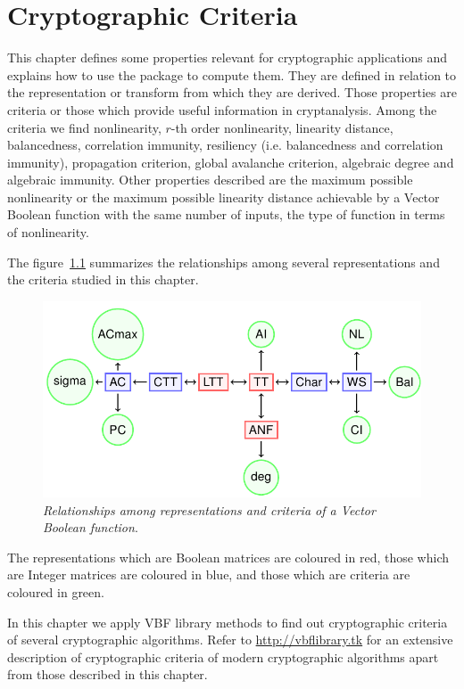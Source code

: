 
\chapter{Cryptographic Criteria}

This chapter defines some properties relevant for cryptographic applications and explains how to use the package to compute them. They are defined in relation to the representation or transform from which they are derived.
Those properties are criteria or those which provide useful information in cryptanalysis. Among the criteria we find nonlinearity, 
$r$-th order nonlinearity, linearity distance, balancedness, correlation immunity, resiliency (i.e. balancedness and correlation immunity), 
propagation criterion, global avalanche criterion, algebraic degree and algebraic immunity. Other properties described are the maximum possible nonlinearity 
or the maximum possible linearity distance achievable by a Vector Boolean function with the same number of inputs, the type of function in terms of nonlinearity.

The figure~\ref{fig:relationshipscriteria} summarizes the relationships among several representations and the criteria studied in this chapter.

\begin{figure}[htbp!]
\centering
\includegraphics[width=\textwidth]{relationships}
\caption[Relationships among representations and criteria of a Vector Boolean function]{\textit{Relationships among representations and criteria of a Vector Boolean function}.}
\label{fig:relationshipscriteria}
\end{figure}

The representations which are Boolean matrices are coloured in red, those which are Integer matrices are coloured in blue, and those which are criteria are coloured in green.

In this chapter we apply VBF library methods to find out cryptographic criteria of several cryptographic algorithms. Refer to \url{http://vbflibrary.tk} for an extensive description of cryptographic criteria of modern cryptographic algorithms apart from those described in this chapter. 

